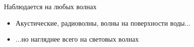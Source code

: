 \documentclass[usenames,dvipsnames,pdftex,unicode,hidelinks]{beamer}
\begin{document}
  \begin{frame}{Наблюдается на любых волнах}
    \begin{itemize}
      \item<1> Акустические, радиоволны, волны на поверхности воды...
        \begin{center}
        \end{center}
      \item<2> ...но нагляднее всего на \alert{световых} волнах
        \begin{center}
        \end{center}
    \end{itemize}
  \end{frame}
\end{document}

